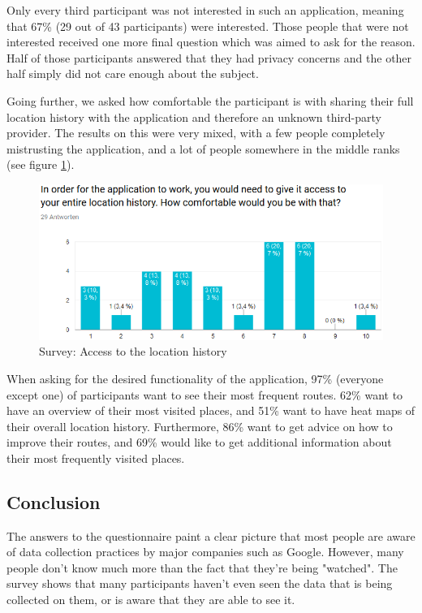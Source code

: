 \documentclass[12p]{article}
\begin{document}
Only every third participant was not interested in such an application, meaning that 67\% (29 out of 43 participants) were interested. Those people that were not interested received one more final question which was aimed to ask for the reason. Half of those participants answered that they had privacy concerns and the other half simply did not care enough about the subject.

Going further, we asked how comfortable the participant is with sharing their full location history with the application and therefore an unknown third-party provider. The results on this were very mixed, with a few people completely mistrusting the application, and a lot of people somewhere in the middle ranks (see figure \ref{fig:survey_location_access}).

\begin{figure}[ht]
    \center
    \includegraphics[width=1\textwidth]{survey/survey2}
    \caption{Survey: Access to the location history}
    \label{fig:survey_location_access}
\end{figure}

When asking for the desired functionality of the application, 97\% (everyone except one) of participants want to see their most frequent routes. 62\% want to have an overview of their most visited places, and 51\% want to have heat maps of their overall location history. Furthermore, 86\% want to get advice on how to improve their routes, and 69\% would like to get additional information about their most frequently visited places.

\subsection{Conclusion}

The answers to the questionnaire paint a clear picture that most people are aware of data collection practices by major companies such as Google. However, many people don't know much more than the fact that they're being "watched". The survey shows that many participants haven't even seen the data that is being collected on them, or is aware that they are able to see it.
\end{document}
